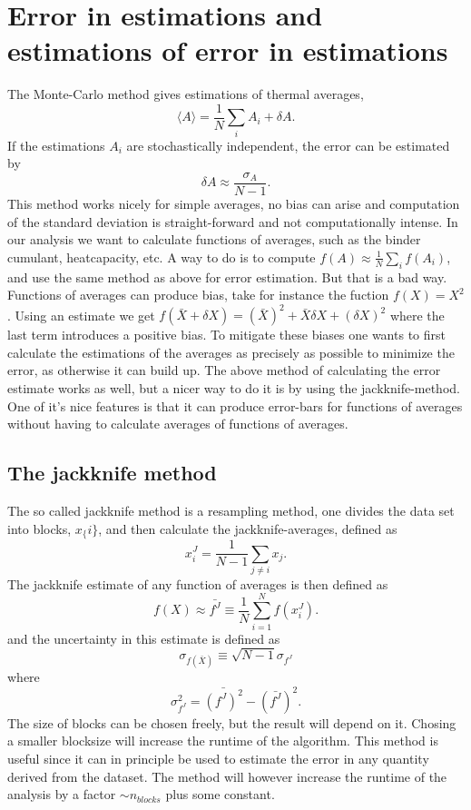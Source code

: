 \section{Error in estimations and estimations of error in estimations}
The Monte-Carlo method gives estimations of thermal averages,
\begin{equation}
  \langle A \rangle = \frac{1}{N}\sum_i A_i +\delta A.
  \label{}
\end{equation}
If the estimations $A_i$ are stochastically independent, the error can be estimated by
\begin{equation}
  \delta A \approx \frac{\sigma_A}{N-1}.
  \label{}
\end{equation}
This method works nicely for simple averages, no bias can arise and computation of the standard deviation is straight-forward and not computationally intense.
In our analysis we want to calculate functions of averages, such as the binder cumulant, heatcapacity, etc.
A way to do is to compute
$f(A) \approx \frac{1}{N}\sum_i f(A_i)$, and use the same method as above for error estimation.
But that is a bad way.
Functions of averages can produce bias, take for instance the fuction $f(X) = X^2$. Using an estimate  we get $ f(\bar{X} + \delta X) = (\bar{X})^2 + \bar{X}\delta X + (\delta X)^2$ where the last term introduces a positive bias.
To mitigate these biases one wants to first calculate the estimations of the averages as precisely as possible to minimize the error, as otherwise it can build up.
The above method of calculating the error estimate works as well, but a nicer way to do it is by using the jackknife-method.
One of it's nice features is that it can produce error-bars for functions of averages without having to calculate averages of functions of averages.
\subsection{The jackknife method}
The so called jackknife method is a resampling method, one divides the data set into blocks, $x_\{i\}$, and then calculate the jackknife-averages, defined as 
\begin{equation}
  x_i^J = \frac{1}{N-1}\sum_{j\neq i}x_j.
\end{equation}
The jackknife estimate of any function of averages is then defined as 
\begin{equation}
  f(X)\approx \bar{f^J}\equiv \frac{1}{N}\sum_{i=1}^{N} f(x_i^J).
  \label{}
\end{equation}
and the uncertainty in this estimate is defined as 
\begin{equation}
  \sigma_{f(\bar{X})} \equiv \sqrt{N-1}\sigma_{f^J}
\end{equation}
where
\begin{equation}
  \sigma^2_{f^J} = \bar{(f^J)^2} - (\bar{f^J})^2.
  \label{}
\end{equation}
The size of blocks can be chosen freely, but the result will depend on it. Chosing a smaller blocksize will increase the runtime of the algorithm.
This method is useful since it can in principle be used to estimate the error in any quantity derived from the dataset.
The method will however increase the runtime of the analysis by a factor $\sim n_{blocks}$ plus some constant.

